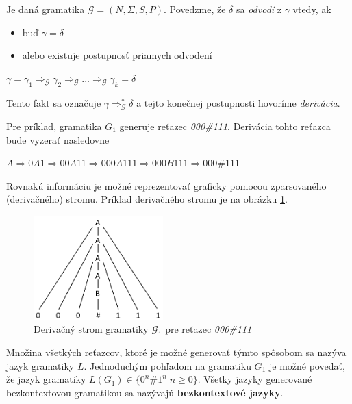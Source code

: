 \begin{definice}
Je daná gramatika $\mathcal{G} = (N, \Sigma , S, P)$. Povedzme, že $\delta$ sa \textit{odvodí} z $\gamma$ vtedy, ak
\begin{itemize}
\item buď $\gamma = \delta$
\item alebo existuje postupnosť priamych odvodení
\end{itemize}
\begin{center}
$\gamma = \gamma_1 \Rightarrow_\mathcal{G} \gamma_2 \Rightarrow_\mathcal{G} ... \Rightarrow_\mathcal{G} \gamma_k = \delta$
\end{center}
Tento fakt sa označuje $\gamma\Rightarrow_\mathcal{G}^*\delta$ a tejto konečnej postupnosti hovoríme \textit{derivácia}. \cite{demlova:gramatiky}
\end{definice}

Pre príklad, gramatika $G_1$ generuje  reťazec \textit{000\#111}. Derivácia tohto reťazca bude vyzerať nasledovne
\begin{center}
$A \Rightarrow 0A1 \Rightarrow 00A11 \Rightarrow 000A111 \Rightarrow 000B111 \Rightarrow 000\#111$
\end{center}

Rovnakú informáciu je možné reprezentovať graficky pomocou zparsovaného (derivačného) stromu. Príklad derivačného stromu je na obrázku \ref{fig:derivacni_strom}. 

\begin{figure}[H]
\begin{center}
\includegraphics[width=5cm]{figures/derivacni_strom.PNG}
\caption{Derivačný strom gramatiky $\mathcal{G}_1$ pre reťazec \textit{000\#111}}
\label{fig:derivacni_strom}
\end{center}
\end{figure}

Množina všetkých reťazcov, ktoré je možné generovať týmto spôsobom sa nazýva jazyk gramatiky $L$. Jednoduchým pohľadom na gramatiku $G_1$ je možné povedať, že jazyk gramatiky $L(G_1) \in \{0^n\#1^n | n \geq 0\}$. Všetky jazyky generované bezkontextovou gramatikou sa nazývajú \textbf{bezkontextové jazyky}.

